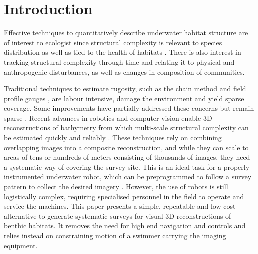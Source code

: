 \section{Introduction} 


Effective techniques to quantitatively describe underwater habitat structure are of interest to ecologist since structural complexity is relevant to species distribution \cite{replaceme} as well as tied to the health of habitats \cite{replaceme}. There is also interest in tracking structural complexity through time and relating it to physical and anthropogenic disturbances, as well as changes in composition of communities. 

Traditional techniques to estimate rugosity, such as the chain method \cite{Luckhurst_1978} \cite{Friedlander_1998} and field profile gauges \cite{McCormick_1994}, are labour intensive, damage the environment and yield sparse coverage. Some improvements have partially addressed these concerns but remain sparse \cite{Dustan_2013}.  Recent advances in robotics and computer vision enable 3D reconstructions of bathymetry from which multi-scale structural complexity can be estimated quickly and reliably \cite{Friedman_2012}. These techniques rely on combining overlapping images into a composite reconstruction, and while they can scale to areas of tens or hundreds of meters consisting of thousands of images, they need a systematic way of covering the survey site. This is an ideal task for a properly instrumented underwater robot, which can be preprogrammed to follow a survey pattern to collect the desired imagery \cite{Williams_2012}. However, the use of robots is still logistically complex, requiring specialised personnel in the field to operate and service the machines.
This paper presents a simple, repeatable and low cost alternative to generate systematic surveys for visual 3D reconstructions of benthic habitats. It removes the need for high end navigation and controls and relies instead on constraining motion of a swimmer carrying the imaging equipment. 

